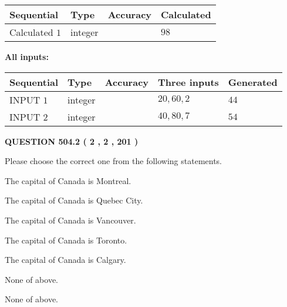 \documentclass[12pt]{article}
\begin{document}
   
  
  
\noindent\begin{tabular}{|l|l|l|l|}
\hline
 Sequential & Type & Accuracy & Calculated \\ 
\hline
 
 
  Calculated $  1 $ & integer &  & 
  $ 98 $ 
 \\  \hline  
 \end{tabular}
   
   
   
   
\noindent\vspace{0.1in}\hspace{-0.08in} {\textbf{\Large{All inputs: }}}
   
   
  
  
\noindent\begin{tabular}{|l|l|l|l|l|}
\hline
 Sequential & Type & Accuracy & Three inputs & Generated \\ 
\hline
 
 
  INPUT $  1 $ & integer &  & $
 20
 , 
 60
 , 
 2
 $ & $ 44 $ 
 \\  \hline  
 
 
  INPUT $  2 $ & integer &  & $
 40
 , 
 80
 , 
 7
 $ & $ 54 $ 
 \\  \hline  
 \end{tabular}
   
   
  
\vspace{0.2in}
  
{\textbf{\Large{QUESTION
504.2 
 ( 2 , 2 , 201 )
}}}
  
  
Please choose the correct one from the following statements.
 
 
The capital of Canada is Montreal.
 
 
The capital of Canada is Quebec City.
 
 
The capital of Canada is Vancouver.
 
 
The capital of Canada is Toronto.
 
 
The capital of Canada is Calgary.
 
 
 None of above.
 
 
\noindent{}
 
 
 None of above.
 
\end{document}
